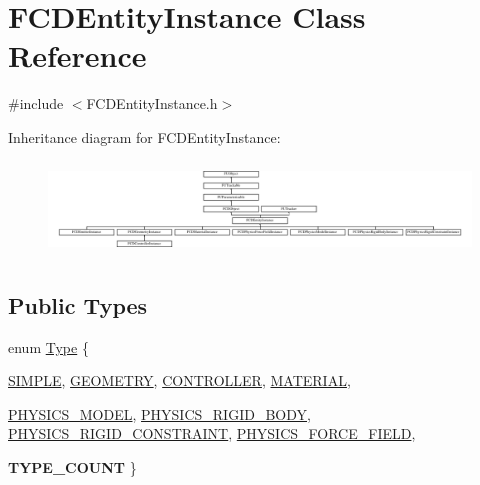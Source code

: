 \hypertarget{classFCDEntityInstance}{
\section{FCDEntityInstance Class Reference}
\label{classFCDEntityInstance}
}


{\ttfamily \#include $<$FCDEntityInstance.h$>$}

Inheritance diagram for FCDEntityInstance:\begin{figure}[H]
\begin{center}
\leavevmode
\includegraphics[height=2.522523cm]{classFCDEntityInstance}
\end{center}
\end{figure}
\subsection*{Public Types}
\begin{DoxyCompactItemize}
\item 
enum \hyperlink{classFCDEntityInstance_a82e95eec7d9242bbedb336b0d35b59d3}{Type} \{ \par
\hyperlink{classFCDEntityInstance_a82e95eec7d9242bbedb336b0d35b59d3aa31de3dc363bacacbbf12a8f9d760477}{SIMPLE}, 
\hyperlink{classFCDEntityInstance_a82e95eec7d9242bbedb336b0d35b59d3a6026b8777b8988f942f78b8172c1604d}{GEOMETRY}, 
\hyperlink{classFCDEntityInstance_a82e95eec7d9242bbedb336b0d35b59d3a96bbf48e06e48db7a862619342469762}{CONTROLLER}, 
\hyperlink{classFCDEntityInstance_a82e95eec7d9242bbedb336b0d35b59d3a7fd9bb75e47a0173ec8298eaaa71ef3f}{MATERIAL}, 
\par
\hyperlink{classFCDEntityInstance_a82e95eec7d9242bbedb336b0d35b59d3a03e68768f437adde6f6c2d518f9db58c}{PHYSICS\_\-MODEL}, 
\hyperlink{classFCDEntityInstance_a82e95eec7d9242bbedb336b0d35b59d3ac01cf93a002bd04a94094fedd096e9bb}{PHYSICS\_\-RIGID\_\-BODY}, 
\hyperlink{classFCDEntityInstance_a82e95eec7d9242bbedb336b0d35b59d3a2f1de96262a206342daf00ceda2bd582}{PHYSICS\_\-RIGID\_\-CONSTRAINT}, 
\hyperlink{classFCDEntityInstance_a82e95eec7d9242bbedb336b0d35b59d3ac30d656db09f41bc66b333ef3e15c819}{PHYSICS\_\-FORCE\_\-FIELD}, 
\par
{\bfseries TYPE\_\-COUNT}
 \}
\end{DoxyCompactItemize}
